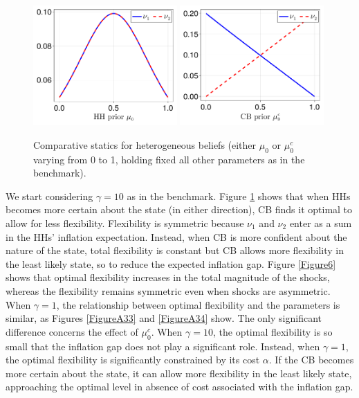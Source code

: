 \documentclass[12pt,a4paper]{article}
\begin{document}
\begin{figure}[h!]
\centering
\includegraphics[width=0.49\textwidth]{figures/V9/γ_10/fig_optimal_ν_μ_0.pdf}
\includegraphics[width=0.49\textwidth]{figures/V9/γ_10/fig_optimal_ν_μ_0_c.pdf}
\caption{Comparative statics for heterogeneous beliefs (either $\mu_0$ or $\mu_0^c$ varying from 0 to 1, holding fixed all other parameters as in the benchmark).}
\label{Figure5}
\end{figure}

We start considering $\gamma=10$ as in the benchmark. Figure \ref{Figure5} shows that when HHs becomes more certain about the state (in either direction), CB finds it optimal to allow for less flexibility. Flexibility is symmetric because $\nu_1$ and $\nu_2$ enter as a sum in the HHs' inflation expectation. Instead, when CB is more confident about the nature of the state, total flexibility is constant but CB allows more flexibility in the least likely state, so to reduce the expected inflation gap. Figure \ref{Figure6} shows that optimal flexibility increases in the total magnitude of the shocks, whereas the flexibility remains symmetric even when shocks are asymmetric. When $\gamma=1$, the relationship between optimal flexibility and the parameters is similar, as Figures \ref{FigureA33} and \ref{FigureA34} show. The only significant difference concerns the effect of $\mu_0^c$. When $\gamma=10$, the optimal flexibility is so small that the inflation gap does not play a significant role. Instead, when $\gamma=1$, the optimal flexibility is significantly constrained by its cost $\alpha$. If the CB becomes more certain about the state, it can allow more flexibility in the least likely state, approaching the optimal level in absence of cost associated with the inflation gap.
\end{document}
